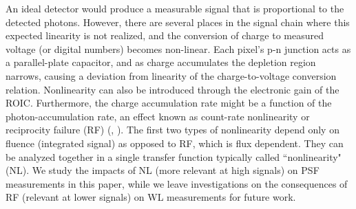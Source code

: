 \documentclass[preprint]{aastex}
\begin{document}
An ideal detector would produce a measurable signal that is proportional to the detected photons. However, there are several places in the signal chain where this expected linearity is not realized, and the conversion of charge to measured voltage (or digital numbers) becomes non-linear. Each pixel's p-n junction acts as a parallel-plate capacitor, and as charge accumulates the depletion region narrows, causing a deviation from linearity of the charge-to-voltage conversion relation. Nonlinearity can also be introduced through the electronic gain of the ROIC. Furthermore, the charge accumulation rate might be a function of the photon-accumulation rate, an effect known as count-rate nonlinearity or reciprocity failure (RF) (\citealt{smith08}, \citealt{biesiadzinski11}). 
The first two types of nonlinearity depend only on fluence (integrated signal) as opposed to RF, which is flux dependent.  They can be analyzed together in a single transfer function typically called ``nonlinearity" (NL). We study the impacts of NL (more relevant at high signals) on PSF measurements in this paper, while we leave investigations on the consequences of RF (relevant at lower signals) on WL measurements for future work. 
\end{document}
